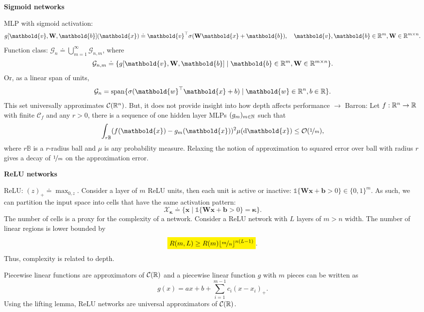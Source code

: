 \documentclass[10pt]{article}
\newenvironment{topic}[1]
{\textbf{\sffamily \footnotesize \colorbox{black}{\rlap{\textbf{\textcolor{white}{#1}}}\hspace{\linewidth}\hspace{-2\fboxsep}}}}
{}
\newenvironment{subtopic}[1]
{\begin{center}\textbf{\footnotesize \sffamily #1}\end{center}}
{}
\renewcommand{\mat}[1]{\ensuremath{\mathbf{#1}}}
\renewcommand{\vec}[1]{\ensuremath{\mathbold{#1}}}
\begin{document}
\begin{multicols*}{3}
\begin{topic}{Feedforward networks}
        \begin{subtopic}{Sigmoid networks}
            MLP with sigmoid activation: \[
                g[\vec{v}, \mat{W}, \vec{b}](\vec{x}) \doteq \transpose{\vec{v}} \sigma(\mat{W}\vec{x}+\vec{b}), \quad \vec{v},\vec{b}\in\R^m, \mat{W}\in\R^{m\times n}.
            \]
            Function class: $\mathcal{G}_n \doteq \bigcup_{m=1}^{\infty} \mathcal{G}_{n,m}$, where \[
                \mathcal{G}_{n,m} \doteq \{ g[\vec{v},\mat{W},\vec{b}] \mid \vec{b}\in\R^m, \mat{W}\in\R^{m\times n} \}.
            \]
            Or, as a linear span of units, \[
                \mathcal{G}_{n} = \mathrm{span} \{ \sigma(\transpose{\vec{w}}\vec{x} + b) \mid \vec{w} \in \R^n, b \in \R \}.
            \]
            This set universally approximates $\mathcal{C}(\mathbb{R}^n)$. But, it does not provide insight into how
            depth affects performance $\to$ Barron: Let $f: \mathbb{R}^n \to \mathbb{R}$ with finite $\mathcal{C}_f$ and any $r
                > 0$, there is a sequence of one hidden layer MLPs $(g_m)_{m \in \mathbb{N}}$ such that \[
                \int_{r \mathbb{B}} (f(\vec{x}) - g_m(\vec{x}))^2 \mu(\mathrm{d}\vec{x}) \leq \bigo{\nicefrac{1}{m}},
            \]
            where $r\mathbb{B}$ is a $r$-radius ball and $\mu$ is any probability measure. Relaxing the notion
            of approximation to squared error over ball with radius $r$ gives a decay of $\nicefrac{1}{m}$ on
            the approximation error.
        \end{subtopic}

        \begin{subtopic}{ReLU networks}
            ReLU: $(z)_+ \doteq \max_{0,z}$. Consider a layer of $m$ ReLU units, then each unit is
            active or inactive: $\mathbb{1}\{ \mat{W}\vec{x} + \vec{b} > 0 \} \in \{ 0,1 \}^m$. As
            such, we can partition the input space into cells that have the same activation pattern: \[
                \mathcal{X}_{\vec{\kappa}} \doteq \{ \vec{x} \mid \mathbb{1}\{ \mat{W}\vec{x} + \vec{b} > 0 \} = \vec{\kappa} \}.
            \]
            The number of cells is a proxy for the complexity of a network. Consider a ReLU network with $L$
            layers of $m > n$ width. The number of linear regions is lower bounded by \[
                \colorbox{yellow}{$\displaystyle R(m,L) \geq R(m) \lfloor \nicefrac{m}{n} \rfloor^{n(L-1)}$}.
            \]
            Thus, complexity is related to depth.

            Piecewise linear functions are approximators of $\mathcal{C}(\mathbb{R})$ and a piecewise linear function
            $g$ with $m$ pieces can be written as \[
                g(x) = ax + b + \sum_{i=1}^{m-1} c_i(x - x_i)_+.
            \]
            Using the lifting lemma, ReLU networks are universal approximators of $\mathcal{C}(\mathbb{R})$.
        \end{subtopic}


\end{topic}
\end{multicols*}
\end{document}

